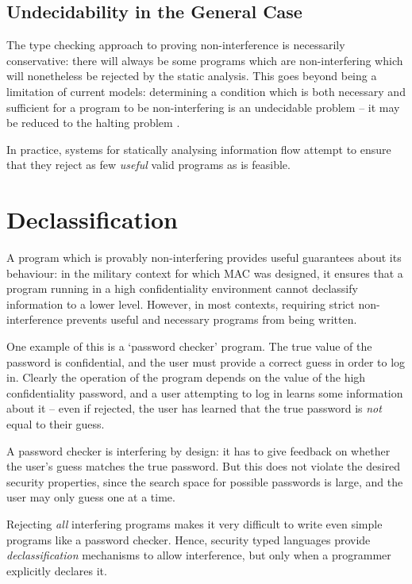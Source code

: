 \subsection{Undecidability in the General Case}

The type checking approach to proving non-interference is necessarily conservative: there will always be some programs which are non-interfering which will nonetheless be rejected by the static analysis. This goes beyond being a limitation of current models: determining a condition which is both necessary and sufficient for a program to be non-interfering is an undecidable problem \cite{denning1977certification}\cite{landi1992undecidability} -- it may be reduced to the halting problem \cite{sabelfeld2003if}.

In practice, systems for statically analysing information flow attempt to ensure that they reject as few \textit{useful} valid programs as is feasible.

\section{Declassification}

A program which is provably non-interfering provides useful guarantees about its behaviour: in the military context for which MAC was designed, it ensures that a program running in a high confidentiality environment cannot declassify information to a lower level. However, in most contexts, requiring strict non-interference prevents useful and necessary programs from being written.

One example of this is a `password checker' program. The true value of the password is confidential, and the user must provide a correct guess in order to log in. Clearly the operation of the program depends on the value of the high confidentiality password, and a user attempting to log in learns some information about it -- even if rejected, the user has learned that the true password is \textit{not} equal to their guess.

A password checker is interfering by design: it has to give feedback on whether the user's guess matches the true password. But this does not violate the desired security properties, since the search space for possible passwords is large, and the user may only guess one at a time.

Rejecting \textit{all} interfering programs makes it very difficult to write even simple programs like a password checker. Hence, security typed languages provide \textit{declassification} mechanisms to allow interference, but only when a programmer explicitly declares it.

